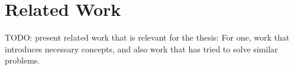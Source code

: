 \chapter{Related Work}\label{chap:related}

TODO: present related work that is relevant for the thesis: For one, work that introduces necessary concepts, and also work that has tried to solve similar problems.